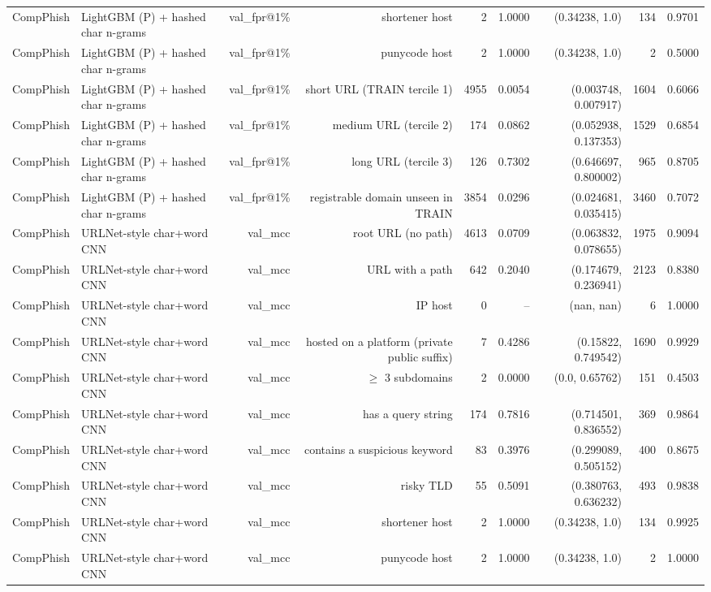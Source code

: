 \begin{table}[t]
\begin{tabular}{llrrrrrrr}
CompPhish & LightGBM (P) + hashed char n-grams & val\_fpr@1\% & shortener host & 2 & 1.0000 & (0.34238, 1.0) & 134 & 0.9701 \\
CompPhish & LightGBM (P) + hashed char n-grams & val\_fpr@1\% & punycode host & 2 & 1.0000 & (0.34238, 1.0) & 2 & 0.5000 \\
CompPhish & LightGBM (P) + hashed char n-grams & val\_fpr@1\% & short URL (TRAIN tercile 1) & 4955 & 0.0054 & (0.003748, 0.007917) & 1604 & 0.6066 \\
CompPhish & LightGBM (P) + hashed char n-grams & val\_fpr@1\% & medium URL (tercile 2) & 174 & 0.0862 & (0.052938, 0.137353) & 1529 & 0.6854 \\
CompPhish & LightGBM (P) + hashed char n-grams & val\_fpr@1\% & long URL (tercile 3) & 126 & 0.7302 & (0.646697, 0.800002) & 965 & 0.8705 \\
CompPhish & LightGBM (P) + hashed char n-grams & val\_fpr@1\% & registrable domain unseen in TRAIN & 3854 & 0.0296 & (0.024681, 0.035415) & 3460 & 0.7072 \\
CompPhish & URLNet-style char+word CNN & val\_mcc & root URL (no path) & 4613 & 0.0709 & (0.063832, 0.078655) & 1975 & 0.9094 \\
CompPhish & URLNet-style char+word CNN & val\_mcc & URL with a path & 642 & 0.2040 & (0.174679, 0.236941) & 2123 & 0.8380 \\
CompPhish & URLNet-style char+word CNN & val\_mcc & IP host & 0 & -- & (nan, nan) & 6 & 1.0000 \\
CompPhish & URLNet-style char+word CNN & val\_mcc & hosted on a platform (private public suffix) & 7 & 0.4286 & (0.15822, 0.749542) & 1690 & 0.9929 \\
CompPhish & URLNet-style char+word CNN & val\_mcc & $\geq$ 3 subdomains & 2 & 0.0000 & (0.0, 0.65762) & 151 & 0.4503 \\
CompPhish & URLNet-style char+word CNN & val\_mcc & has a query string & 174 & 0.7816 & (0.714501, 0.836552) & 369 & 0.9864 \\
CompPhish & URLNet-style char+word CNN & val\_mcc & contains a suspicious keyword & 83 & 0.3976 & (0.299089, 0.505152) & 400 & 0.8675 \\
CompPhish & URLNet-style char+word CNN & val\_mcc & risky TLD & 55 & 0.5091 & (0.380763, 0.636232) & 493 & 0.9838 \\
CompPhish & URLNet-style char+word CNN & val\_mcc & shortener host & 2 & 1.0000 & (0.34238, 1.0) & 134 & 0.9925 \\
CompPhish & URLNet-style char+word CNN & val\_mcc & punycode host & 2 & 1.0000 & (0.34238, 1.0) & 2 & 1.0000 \\

\end{tabular}
\end{table}
